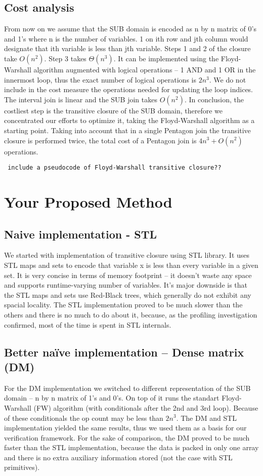 \documentclass[letterpaper]{article}
\begin{document}
\subsection{Cost analysis}
From now on we assume that the SUB domain is encoded as n by n matrix of 0's and 1's 
where n is the number of variables. 1 on ith row and jth column would designate 
that ith variable is less than jth variable. Steps 1 and 2 of the closure 
take \(O(n^2)\). Step 3 takes \(\Theta(n^3)\). It can be implemented using the Floyd-Warshall 
algorithm \cite{Floyd1962} augmented with logical operations – 1 AND and 1 OR in the innermost 
loop, thus the exact number of logical operations is \(2n^3\). We do not include in the cost measure
the operations needed for updating the loop indices. The interval join is 
linear and the SUB join takes \(O(n^2)\). In conclusion, the costliest step is 
the transitive closure of the SUB domain, therefore we concentrated our efforts 
to optimize it, taking the Floyd-Warshall algorithm as a starting point. 
Taking into account that in a single Pentagon join the transitive closure is 
performed twice, the total cost of a Pentagon join is \(4n^3 + O(n^2)\) operations.

\texttt{ include a pseudocode of Floyd-Warshall transitive closure?? }

\section{Your Proposed Method}\label{sec:yourmethod}


\subsection{Naive implementation - STL}
We started with implementation of transitive closure using STL library. 
It uses STL maps and sets to encode that variable x is less than every 
variable in a given set. It is very concise in terms of memory 
footprint -- it doesn't waste any space and supports runtime-varying 
number of variables. It's major downside is that the STL maps and sets 
use Red-Black trees, which generally do not exhibit any spacial locality. 
The STL implementation proved to be much slower than the others and there 
is no much to do about it, because, as the profiling investigation 
confirmed, most of the time is spent in STL internals.

\subsection{Better naïve implementation – Dense matrix (DM)}
For the DM implementation we switched to different representation of the 
SUB domain – n by n matrix of 1's and 0's. On top of it runs the standart 
Floyd-Warshall (FW) algorithm (with conditionals after the 2nd and 3rd loop). 
Because of these conditionals the op count may be less than \(2n^3\). The DM 
and STL implementation yielded the same results, thus we used them as a 
basis for our verification framework. For the sake of comparison, the DM 
proved to be much faster than the STL implementation, because the data is 
packed in only one array and there is no extra auxiliary information stored (not the case with STL primitives).
\end{document}
